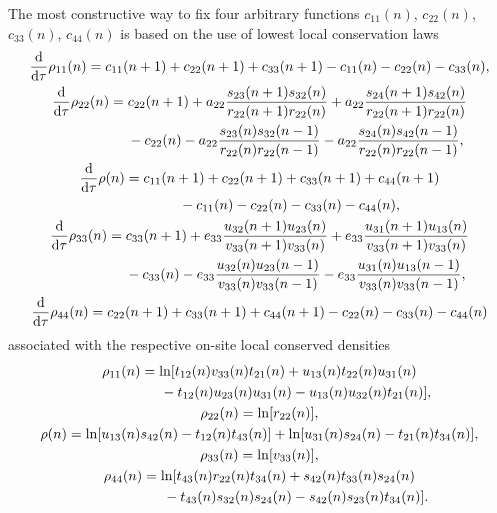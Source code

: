 \documentclass[10pt,a4paper]{amsart}
\numberwithin{equation}{section}
\begin{document}
The most constructive way to fix four arbitrary functions $c_{11}(n)$, $c_{22}(n)$, $c_{33}(n)$, $c_{44}(n)$ is based on the use of lowest local conservation laws
\begin{gather}\label{eq-4.1}
 \frac{\mathrm{d}}{\mathrm{d}\tau}\rho_{11}(n)=c_{11}(n+1)+c_{22}(n+1)+c_{33}(n+1) -c_{11}(n)-c_{22}(n)-c_{33}(n),
\\
 \frac{\mathrm{d}}{\mathrm{d}\tau}\rho_{22}(n)=c_{22}(n+1) + a_{22}\frac{s_{23}(n+1)s_{32}(n)}{r_{22}(n+1)r_{22}(n)} + a_{22}\frac{s_{24}(n+1)s_{42}(n)}{r_{22}(n+1)r_{22}(n)}\nonumber\\
 \hphantom{\frac{\mathrm{d}}{\mathrm{d}\tau}\rho_{22}(n)=}{}
 -c_{22}(n)-a_{22}\frac{s_{23}(n)s_{32}(n-1)}{r_{22}(n)r_{22}(n-1)}- a_{22}\frac{s_{24}(n)s_{42}(n-1)}{r_{22}(n)r_{22}(n-1)}, \label{eq-4.2}
\\
 \frac{\mathrm{d}}{\mathrm{d}\tau}\rho(n)=c_{11}(n+1)+c_{22}(n+1)+c_{33}(n+1)+c_{44}(n+1)\nonumber\\
 \hphantom{\frac{\mathrm{d}}{\mathrm{d}\tau}\rho(n)=}{}
 -c_{11}(n)-c_{22}(n)-c_{33}(n)-c_{44}(n),\label{eq-4.3}
\\
 \frac{\mathrm{d}}{\mathrm{d}\tau}\rho_{33}(n)=c_{33}(n+1) + e_{33}\frac{u_{32}(n+1)u_{23}(n)}{v_{33}(n+1)v_{33}(n)} + e_{33}\frac{u_{31}(n+1)u_{13}(n)}{v_{33}(n+1)v_{33}(n)}\nonumber\\
 \hphantom{\frac{\mathrm{d}}{\mathrm{d}\tau}\rho_{33}(n)=}{}
 -c_{33}(n)-e_{33}\frac{u_{32}(n)u_{23}(n-1)}{v_{33}(n)v_{33}(n-1)}- e_{33}\frac{u_{31}(n)u_{13}(n-1)}{v_{33}(n)v_{33}(n-1)}, \label{eq-4.4}
\\
 \frac{\mathrm{d}}{\mathrm{d}\tau}\rho_{44}(n)=c_{22}(n+1)+c_{33}(n+1)+c_{44}(n+1) -c_{22}(n)-c_{33}(n)-c_{44}(n) \label{eq-4.5}
\end{gather}
associated with the respective on-site local conserved densities
\begin{gather}
 \rho_{11}(n)=\ln[t_{12}(n)v_{33}(n)t_{21}(n)+u_{13}(n)t_{22}(n)u_{31}(n)\nonumber\\
 \hphantom{\rho_{11}(n)=\ln[}{}
	-t_{12}(n)u_{23}(n)u_{31}(n)-u_{13}(n)u_{32}(n)t_{21}(n)], \label{eq-4.6}
\\
	\rho_{22}(n)=\ln[r_{22}(n)], \label{eq-4.7}
\\
	\rho(n)=\ln[u_{13}(n)s_{42}(n)-t_{12}(n)t_{43}(n)]+\ln[u_{31}(n)s_{24}(n)-t_{21}(n)t_{34}(n)], \label{eq-4.8}
\\
	\rho_{33}(n)=\ln[v_{33}(n)], \label{eq-4.9}
\\
	\rho_{44}(n)=\ln[t_{43}(n)r_{22}(n)t_{34}(n)+s_{42}(n)t_{33}(n)s_{24}(n)\nonumber\\
\hphantom{\rho_{44}(n)=\ln[}{}
	-t_{43}(n)s_{32}(n)s_{24}(n)-s_{42}(n)s_{23}(n)t_{34}(n)] . \label{eq-4.10}
\end{gather}
\end{document}
